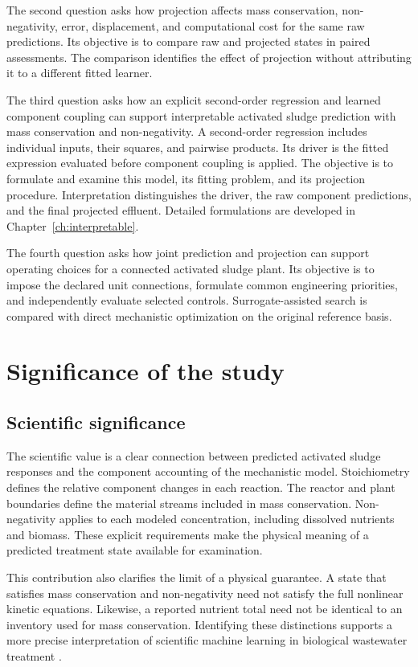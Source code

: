 The second question asks how projection affects mass conservation, non-negativity, error, displacement, and computational cost for the same raw predictions. Its objective is to compare raw and projected states in paired assessments. The comparison identifies the effect of projection without attributing it to a different fitted learner.

The third question asks how an explicit second-order regression and learned component coupling can support interpretable activated sludge prediction with mass conservation and non-negativity. A second-order regression includes individual inputs, their squares, and pairwise products. Its driver is the fitted expression evaluated before component coupling is applied. The objective is to formulate and examine this model, its fitting problem, and its projection procedure. Interpretation distinguishes the driver, the raw component predictions, and the final projected effluent. Detailed formulations are developed in Chapter~\ref{ch:interpretable}.

The fourth question asks how joint prediction and projection can support operating choices for a connected activated sludge plant. Its objective is to impose the declared unit connections, formulate common engineering priorities, and independently evaluate selected controls. Surrogate-assisted search is compared with direct mechanistic optimization on the original reference basis.

\section{Significance of the study}

\subsection{Scientific significance}

The scientific value is a clear connection between predicted activated sludge responses and the component accounting of the mechanistic model. Stoichiometry defines the relative component changes in each reaction. The reactor and plant boundaries define the material streams included in mass conservation. Non-negativity applies to each modeled concentration, including dissolved nutrients and biomass. These explicit requirements make the physical meaning of a predicted treatment state available for examination.

This contribution also clarifies the limit of a physical guarantee. A state that satisfies mass conservation and non-negativity need not satisfy the full nonlinear kinetic equations. Likewise, a reported nutrient total need not be identical to an inventory used for mass conservation. Identifying these distinctions supports a more precise interpretation of scientific machine learning in biological wastewater treatment \citep{Henze2006,TakacsVanrolleghem2006}.

